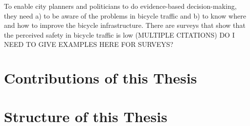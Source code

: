To enable city planners and politicians to do evidence-based decision-making, they need a) to be aware of the problems in bicycle traffic and b) to know where and how to improve the bicycle infrastructure.
There are surveys that show that the perceived safety in bicycle traffic is low (MULTIPLE CITATIONS)
DO I NEED TO GIVE EXAMPLES HERE FOR SURVEYS?

\section{Contributions of this Thesis}
\label{sec:contributions}

\section{Structure of this Thesis}
\label{sec:structure}